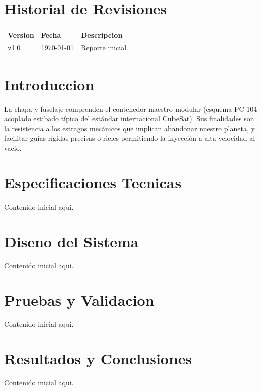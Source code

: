 \documentclass[a4paper, twoside, 12pt]{report}
\begin{document}

\begin{abstract}
    Escribe aqui el resumen ejecutivo del reporte.
\end{abstract}

\chapter*{Historial de Revisiones}
\begin{center}
\begin{tabular}{p{2cm} p{3cm} p{9cm}}
\toprule
\textbf{Version} & \textbf{Fecha} & \textbf{Descripcion} \\
\midrule
v1.0 & \today & Reporte inicial. \\
\bottomrule
\end{tabular}
\end{center}

\clearpage
\tableofcontents
\listoffigures
\listoftables
\clearpage


\chapter{Introduccion}
La chapa y fuselaje comprenden el contenedor maestro modular (esquema PC-104 acoplado estibado típico del estándar internacional CubeSat). Sus finalidades son la resistencia a los estragos mecánicos que implican abandonar nuestro planeta, y facilitar guías rígidas precisas o rieles permitiendo la inyección a alta velocidad al vacio.

\chapter{Especificaciones Tecnicas}
Contenido inicial aqui.

\chapter{Diseno del Sistema}
Contenido inicial aqui.

\chapter{Pruebas y Validacion}
Contenido inicial aqui.

\chapter{Resultados y Conclusiones}
Contenido inicial aqui.

% 
% 
\end{document}

